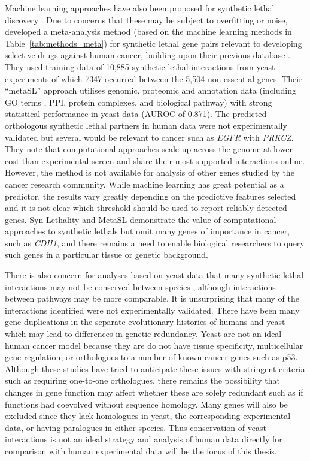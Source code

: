 Machine learning approaches have also been proposed for \gls{synthetic lethal} discovery \citep{Babyak2004, Lee2009}. Due to concerns that these may be subject to overfitting or noise, \citet{Wu2014} developed a meta-analysis method (based on the machine learning methods in Table~\ref{tab:methods_meta}) for \gls{synthetic lethal} gene pairs relevant to developing selective drugs against human cancer, building upon their previous database \citep{Li2014}. They used training data of 10,885 \gls{synthetic lethal} interactions from yeast experiments of which 7347 occurred between the 5,504 non-essential genes. Their ``metaSL'' approach utilises genomic, proteomic and annotation data (including GO terms \cite{Ashburner2000}, PPI, protein complexes, and biological pathway) with strong statistical performance in yeast data (\gls{AUROC} of 0.871). The predicted orthologous \gls{synthetic lethal} partners in human data were not experimentally validated but several would be relevant to cancer such as \textit{EGFR} with \textit{PRKCZ}. They note that computational approaches scale-up across the genome at lower cost than experimental screen and share their most supported interactions online. However, the method is not available for analysis of other genes studied by the cancer research community. While machine learning has great potential as a predictor, the results vary greatly depending on the predictive features selected and it is not clear which threshold should be used to report reliably detected genes. Syn-Lethality \citep{Li2014} and MetaSL \citep{Wu2014} demonstrate the value of computational approaches to \glspl{synthetic lethal} but omit many genes of importance in cancer, such as \textit{CDH1}, and there remains a need to enable biological researchers to query such genes in a particular tissue or genetic background. 

There is also concern for analyses based on yeast data that many \gls{synthetic lethal} interactions may not be conserved between species \citet{Dixon2009a}, although interactions between pathways may be more comparable. It is unsurprising that many of the interactions identified were not experimentally validated. There have been many gene duplications in the separate evolutionary histories of humans and yeast which may lead to differences in genetic redundancy. Yeast are not an ideal human cancer model because they are do not have tissue specificity, multicellular gene regulation, or orthologues to a number of known cancer genes such as p53. Although these studies have tried to anticipate these issues with stringent criteria such as requiring one-to-one orthologues, there remains the possibility that changes in gene function may affect whether these are solely redundant such as if functions had coevolved without sequence homology. Many genes will also be excluded since they lack homologues in yeast, the corresponding experimental data, or having paralogues in either species. Thus conservation of yeast interactions is not an ideal strategy and analysis of human data directly for comparison with human experimental data will be the focus of this thesis. 

